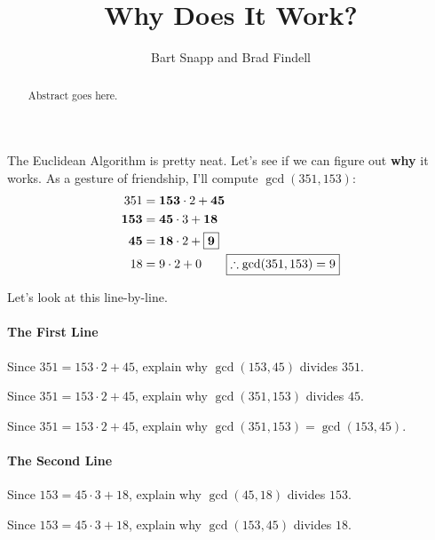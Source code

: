 \documentclass{ximera}
\title{Why Does It Work?}
\author{Bart Snapp and Brad Findell}
\begin{document}
\begin{abstract}
Abstract goes here.  
\end{abstract}
\maketitle

\label{A:GCDwork}

The Euclidean Algorithm is pretty
neat. Let's see if we can figure out \textbf{why} it works. As a gesture of friendship, I'll compute $\gcd(351,153)$:
\begin{align*}
351 &= \boldsymbol{153}\cdot 2 + \boldsymbol{45}\\ 
\boldsymbol{153} &= \boldsymbol{45}\cdot 3 + \boldsymbol{18}\\
\boldsymbol{45} &= \boldsymbol{18}\cdot 2 + \fbox{$\boldsymbol{9}$}\\
18 &= 9\cdot 2 + 0 \qquad \fbox{$\therefore \gcd(351,153) = 9$}
\end{align*}

Let's look at this line-by-line.

\paragraph{The First Line}
\begin{problem}
Since $351 = 153\cdot 2 + 45$, explain why $\gcd(153,45)$ divides $351$.
\end{problem}

\begin{problem}
Since $351 = 153\cdot 2 + 45$, explain why $\gcd(351,153)$ divides $45$.
\end{problem}

\begin{problem}
Since $351 = 153\cdot 2 + 45$, explain why $\gcd(351,153) = \gcd(153,45)$.
\end{problem}


\paragraph{The Second Line}
\begin{problem}
Since $153 = 45\cdot 3 + 18$, explain why $\gcd(45,18)$ divides $153$.
\end{problem}

\begin{problem}
Since $153 = 45\cdot 3 + 18$, explain why $\gcd(153,45)$ divides $18$.
\end{problem}
\end{document}

